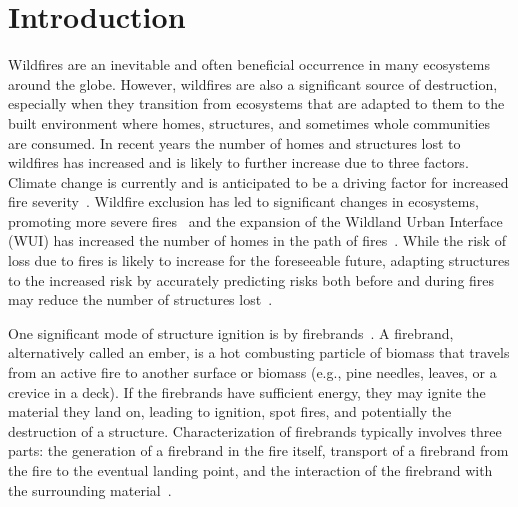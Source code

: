 
\chapter{Introduction}
\label{part:intro}
    Wildfires are an inevitable and often beneficial occurrence in many ecosystems around the globe. However, wildfires are also a significant source of destruction, especially when they transition from ecosystems that are adapted to them to the built environment where homes, structures, and sometimes whole communities are consumed. In recent years the number of homes and structures lost to wildfires has increased and is likely to further increase due to three factors. Climate change is currently and is anticipated to be a driving factor for increased fire severity~\cite{Levin2021Unveiling2019/2020}. Wildfire exclusion has led to significant changes in ecosystems, promoting more severe fires~\cite{Marlon2012Long-termUSA, Keeley2019} and the expansion of the Wildland Urban Interface (WUI) has increased the number of homes in the path of fires~\cite{Radeloff2018RapidRisk, Hammer2009DemographicManagement, }. While the risk of loss due to fires is likely to increase for the foreseeable future, adapting structures to the increased risk by accurately predicting risks both before and during fires may reduce the number of structures lost~\cite{Manzello2021}. 
    
   One significant mode of structure ignition is by firebrands~\cite{Manzello2020}. A firebrand, alternatively called an ember, is a hot combusting particle of biomass that travels from an active fire to another surface or biomass (e.g., pine needles, leaves, or a crevice in a deck). If the firebrands have sufficient energy, they may ignite the material they land on, leading to ignition, spot fires, and potentially the destruction of a structure. Characterization of firebrands typically involves three parts: the generation of a firebrand in the fire itself, transport of a firebrand from the fire to the eventual landing point, and the interaction of the firebrand with the surrounding material~\cite{Babrauskas2003}. 
    
